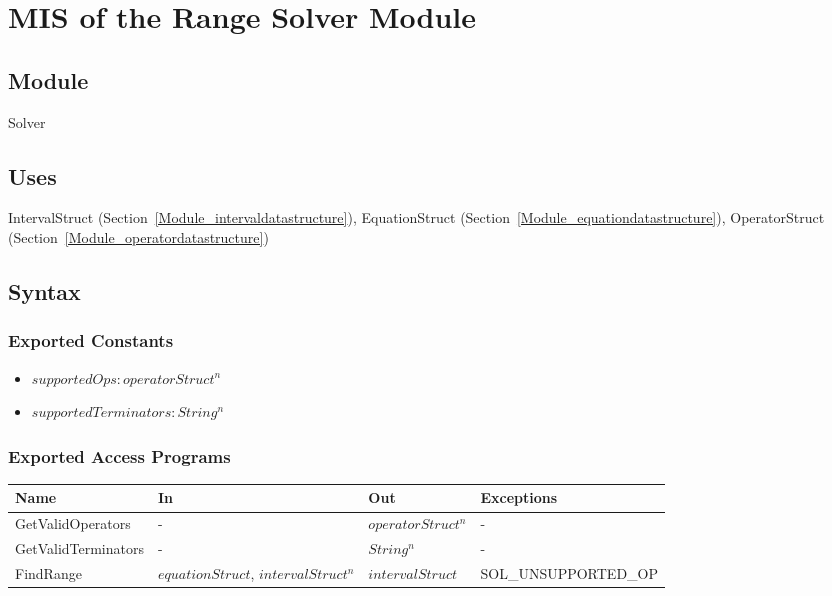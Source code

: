\documentclass[12pt, titlepage]{article}
\begin{document}
\newpage

\section{MIS of the Range Solver Module} 
\label{Module_rangesolver}

\subsection{Module}

Solver

\subsection{Uses}

IntervalStruct (Section~\ref{Module_intervaldatastructure}), EquationStruct 
(Section~\ref{Module_equationdatastructure}), OperatorStruct (Section~\ref{Module_operatordatastructure})

\subsection{Syntax}

\subsubsection{Exported Constants}

\begin{itemize}
	\item $supportedOps : operatorStruct^n$
	\item $supportedTerminators : String^n$
\end{itemize}

\subsubsection{Exported Access Programs}

\begin{center}
	\begin{tabular}{p{3.5cm} p{3cm} p{3cm} p{5cm}}
		\hline
		\textbf{Name} & \textbf{In} & \textbf{Out} & \textbf{Exceptions} \\
		\hline
		GetValidOperators & - & $operatorStruct^n$ & -\\
		GetValidTerminators & - & $String^n$ & -\\
		\multirow{2}{3.1cm}{FindRange} & $equationStruct$, $intervalStruct^n$ & 
		\multirow{2}{3cm}{$intervalStruct$} & 
		\multirow{2}{5cm}{SOL\_UNSUPPORTED\_OP}\\
		\hline
	\end{tabular}
\end{center}
\end{document}
